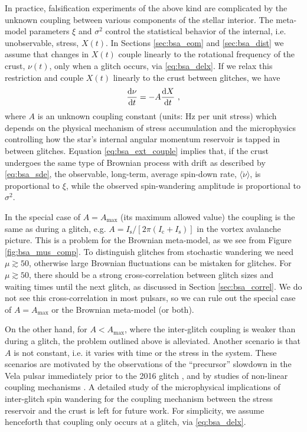 In practice, falsification experiments of the above kind are complicated by the unknown coupling between various components of the stellar interior. The meta-model parameters $\xi$ and $\sigma^2$ control the statistical behavior of the internal, i.e. unobservable, stress, $X(t)$. In Sections \ref{sec:bsa_eom} and \ref{sec:bsa_dist} we assume that changes in $X(t)$ couple linearly to the rotational frequency of the crust, $\nu(t)$, only when a glitch occurs, via \eqref{eq:bsa_delx}. If we relax this restriction and couple $X(t)$ linearly to the crust between glitches, we have
\begin{align}
\label{eq:bsa_ext_couple}
\frac{\textrm{d} \nu}{\textrm{d} t} = -A \frac{\textrm{d} X}{\textrm{d} t}\ ,
\end{align}
where $A$ is an unknown coupling constant (units: Hz per unit stress) which depends on the physical mechanism of stress accumulation and the microphysics controlling how the star's internal angular momentum reservoir is tapped in between glitches. Equation \eqref{eq:bsa_ext_couple} implies that, if the crust undergoes the same type of Brownian process with drift as described by \eqref{eq:bsa_sde}, the observable, long-term, average spin-down rate, $\langle\dot{\nu}\rangle$, is proportional to $\xi$, while the observed spin-wandering amplitude is proportional to $\sigma^2$. 

In the special case of $A=A_\textrm{max}$ (its maximum allowed value) the coupling is the same as during a glitch, e.g. $A = I_\textrm{s} / [2\pi (I_\textrm{c} + I_\textrm{s})]$ in the vortex avalanche picture. This is a problem for the Brownian meta-model, as we see from Figure \ref{fig:bsa_mus_comp}. To distinguish glitches from stochastic wandering we need $\mu \gtrsim 50$, otherwise large Brownian fluctuations can be mistaken for glitches. For $\mu \gtrsim 50$, there should be a strong cross-correlation between glitch sizes and waiting times until the next glitch, as discussed in Section \ref{sec:bsa_correl}. We do not see this cross-correlation in most pulsars, so we can rule out the special case of $A=A_\textrm{max}$ or the Brownian meta-model (or both).

On the other hand, for $A < A_\textrm{max}$, where the inter-glitch coupling is weaker than during a glitch, the problem outlined above is alleviated. Another scenario is that $A$ is not constant, i.e. it varies with time or the stress in the system. These scenarios are motivated by the observations of the ``precursor'' slowdown in the Vela pulsar immediately prior to the 2016 glitch \citep{Ashton2019}, and by studies of non-linear coupling mechanisms \citep{Akbal2017, Celora2020}. A detailed study of the microphysical implications of inter-glitch spin wandering for the coupling mechanism between the stress reservoir and the crust is left for future work. For simplicity, we assume henceforth that coupling only occurs at a glitch, via \eqref{eq:bsa_delx}.

